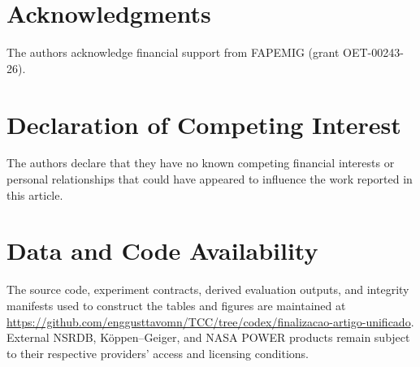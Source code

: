\documentclass[10pt,journal]{IEEEtran}
\begin{document}




\section*{Acknowledgments}
The authors acknowledge financial support from FAPEMIG (grant OET-00243-26).

\section*{Declaration of Competing Interest}
The authors declare that they have no known competing financial interests or
personal relationships that could have appeared to influence the work
reported in this article.

\section*{Data and Code Availability}
The source code, experiment contracts, derived evaluation outputs, and
integrity manifests used to construct the tables and figures are maintained at
\url{https://github.com/enggusttavomn/TCC/tree/codex/finalizacao-artigo-unificado}.
External NSRDB, K\"oppen--Geiger, and NASA POWER products remain subject to
their respective providers' access and licensing conditions.

\appendices




\end{document}
